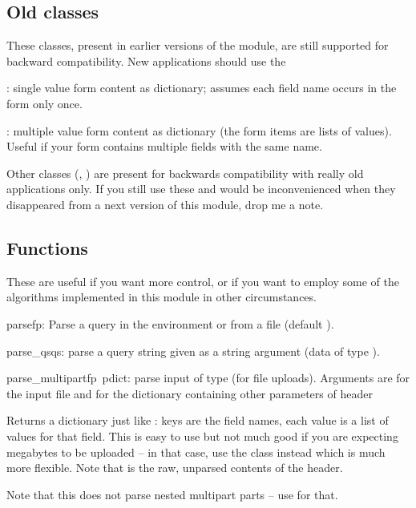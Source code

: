 \subsection{Old classes}

These classes, present in earlier versions of the  module, are still 
supported for backward compatibility.  New applications should use the 

: single value form content as dictionary; assumes each 
field name occurs in the form only once.

: multiple value form content as dictionary (the form
items are lists of values).  Useful if your form contains multiple
fields with the same name.

Other classes (, ) are present for
backwards compatibility with really old applications only.  If you still 
use these and would be inconvenienced when they disappeared from a next 
version of this module, drop me a note.


\subsection{Functions}

These are useful if you want more control, or if you want to employ
some of the algorithms implemented in this module in other
circumstances.

\begin{funcdesc}{parse}{fp}: Parse a query in the environment or from a file (default ).
\end{funcdesc}

\begin{funcdesc}{parse_qs}{qs}: parse a query string given as a string argument (data of type 
).
\end{funcdesc}

\begin{funcdesc}{parse_multipart}{fp\, pdict}: parse input of type  (for 
file uploads).  Arguments are  for the input file and 
     for the dictionary containing other parameters of  header

    Returns a dictionary just like : keys are the field names, each 
    value is a list of values for that field.  This is easy to use but not 
    much good if you are expecting megabytes to be uploaded -- in that case, 
    use the  class instead which is much more flexible.  Note 
    that  is the raw, unparsed contents of the  
    header.

    Note that this does not parse nested multipart parts -- use  for 
    that.
\end{funcdesc}

